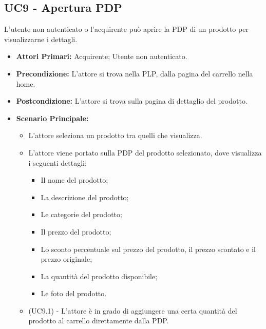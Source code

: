 
\subsection{UC9 - Apertura PDP}
\label{UC9}
L'utente non autenticato o l'acquirente può aprire la PDP di un prodotto per visualizzarne i dettagli. 
\begin{itemize}
    \item \textbf{Attori Primari:} Acquirente; Utente non autenticato.
    \item \textbf{Precondizione:} L'attore si trova nella PLP, dalla pagina del carrello nella home.
    \item \textbf{Postcondizione:} L'attore si trova sulla pagina di dettaglio del prodotto.
    \item \textbf{Scenario Principale:}
        \begin{itemize}
            \item L'attore seleziona un prodotto tra quelli che visualizza.
            \item L'attore viene portato sulla PDP del prodotto selezionato, dove visualizza i seguenti dettagli:
            \begin{itemize}
                \item Il nome del prodotto;
                \item La descrizione del prodotto;
                \item Le categorie del prodotto;
                \item Il prezzo del prodotto;
                \item Lo sconto percentuale sul prezzo del prodotto, il prezzo scontato e il prezzo originale;
                \item La quantità del prodotto disponibile;
                \item Le foto del prodotto.
            \end{itemize}
            \item (UC9.1) - L'attore è in grado di aggiungere una certa quantità del prodotto al carrello direttamente dalla PDP. 
        \end{itemize}
\end{itemize}


